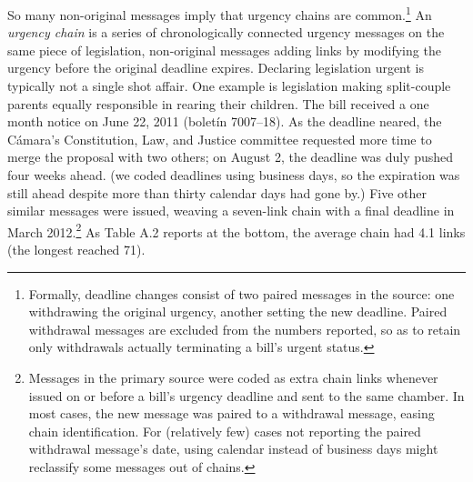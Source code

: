 \documentclass[letter,12pt]{article}
\begin{document}
So many non-original messages imply that urgency chains are common.\footnote{Formally, deadline changes consist of two paired messages in the source: one withdrawing the original urgency, another setting the new deadline. Paired withdrawal messages are excluded from the numbers reported, so as to retain only withdrawals actually terminating a bill's urgent status.} An \emph{urgency chain} is a series of chronologically connected urgency messages on the same piece of legislation, non-original messages adding links by modifying the urgency before the original deadline expires. Declaring legislation urgent is typically not a single shot affair. One example is legislation making split-couple parents equally responsible in rearing their children. The bill received a one month notice on June 22, 2011 (bolet\'in 7007--18). As the deadline neared, the C\'amara's Constitution, Law, and Justice committee requested more time to merge the proposal with two others; on August 2, the deadline was duly pushed four weeks ahead. (we coded deadlines using business days, so the expiration was still ahead despite more than thirty calendar days had gone by.) Five other similar messages were issued, weaving a seven-link chain with a final deadline in March 2012.\footnote{Messages in the primary source were coded as extra chain links whenever issued on or before a bill's urgency deadline and sent to the same chamber. In most cases, the new message was paired to a withdrawal message, easing chain identification. For (relatively few) cases not reporting the paired withdrawal message's date, using calendar instead of business days might reclassify some messages out of chains.} As Table A.2 reports at the bottom, the average chain had 4.1 links (the longest reached 71). 
\end{document}
